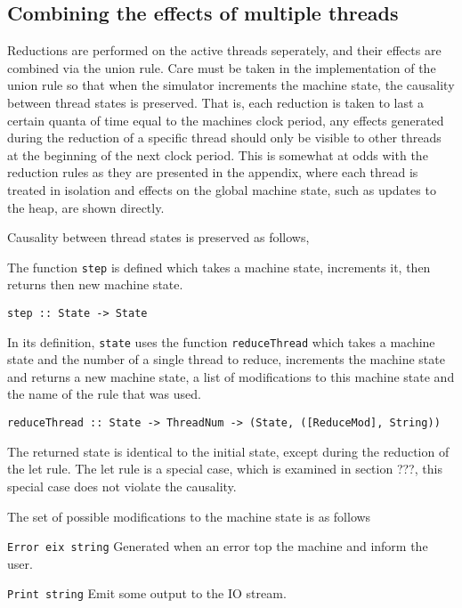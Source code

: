 \subsection{Combining the effects of multiple threads}

Reductions are performed on the active threads seperately, and their effects are combined via the union rule. Care must be taken in the implementation of the union rule so that when the simulator increments the machine state, the causality between thread states is preserved. That is, each reduction is taken to last a certain quanta of time equal to the machines clock period, any effects generated during the reduction of a specific thread should only be visible to other threads at the beginning of the next clock period. This is somewhat at odds with the reduction rules as they are presented in the appendix, where each thread is treated in isolation and effects on the global machine state, such as updates to the heap, are shown directly.

\par
Causality between thread states is preserved as follows, 

The function \texttt{step} is defined which takes a machine state, increments it, then returns then new machine state.

\begin{verbatim}
step :: State -> State
\end{verbatim}

In its definition, \texttt{state} uses the function \texttt{reduceThread} which takes a machine state and the number of a single thread to reduce, increments the machine state and returns a new machine state, a list of modifications to this machine state and the name of the rule that was used.

\begin{verbatim}
reduceThread :: State -> ThreadNum -> (State, ([ReduceMod], String))
\end{verbatim}

The returned state is identical to the initial state, except during the reduction of the let rule. The let rule is a special case, which is examined in section ???, this special case does not violate the causality.

The set of possible modifications to the machine state is as follows

\texttt{Error   eix string}    
Generated when an error top the machine and inform the user.

\texttt{Print   string}
Emit some output to the IO stream.


